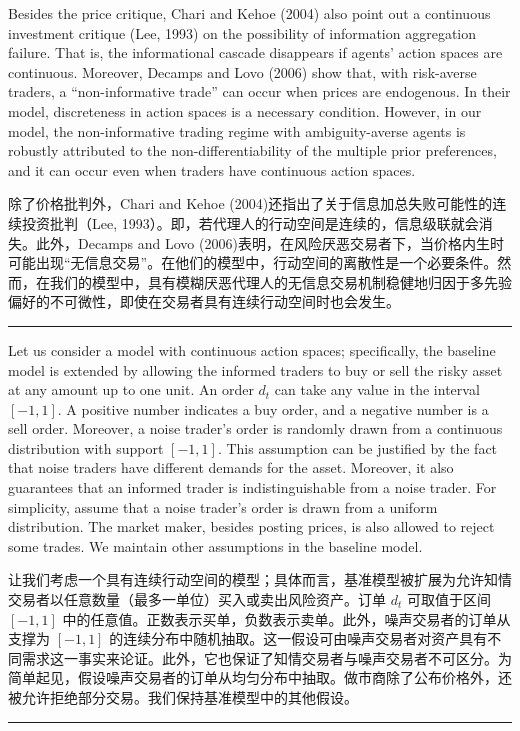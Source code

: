 \documentclass[12pt,a4paper]{article}
\newenvironment{original}{%
  \par\vspace{4pt}\noindent%
  \color{black}%
  \ignorespaces
}{%
  \par\vspace{2pt}%
}
\newenvironment{translation}{%
  \par\vspace{2pt}\noindent%
  \color{transblue}%
  \ignorespaces
}{%
  \par\vspace{4pt}\hrule\vspace{6pt}%
}
\begin{document}
\begin{original}
Besides the price critique, Chari and Kehoe (2004) also point out a continuous investment critique (Lee, 1993) on the possibility of information aggregation failure. That is, the informational cascade disappears if agents' action spaces are continuous. Moreover, Decamps and Lovo (2006) show that, with risk-averse traders, a ``non-informative trade'' can occur when prices are endogenous. In their model, discreteness in action spaces is a necessary condition. However, in our model, the non-informative trading regime with ambiguity-averse agents is robustly attributed to the non-differentiability of the multiple prior preferences, and it can occur even when traders have continuous action spaces.
\end{original}
\begin{translation}
除了价格批判外，Chari and Kehoe (2004)还指出了关于信息加总失败可能性的连续投资批判（Lee, 1993）。即，若代理人的行动空间是连续的，信息级联就会消失。此外，Decamps and Lovo (2006)表明，在风险厌恶交易者下，当价格内生时可能出现``无信息交易''。在他们的模型中，行动空间的离散性是一个必要条件。然而，在我们的模型中，具有模糊厌恶代理人的无信息交易机制稳健地归因于多先验偏好的不可微性，即使在交易者具有连续行动空间时也会发生。
\end{translation}

\begin{original}
Let us consider a model with continuous action spaces; specifically, the baseline model is extended by allowing the informed traders to buy or sell the risky asset at any amount up to one unit. An order $d_t$ can take any value in the interval $[-1, 1]$. A positive number indicates a buy order, and a negative number is a sell order. Moreover, a noise trader's order is randomly drawn from a continuous distribution with support $[-1, 1]$. This assumption can be justified by the fact that noise traders have different demands for the asset. Moreover, it also guarantees that an informed trader is indistinguishable from a noise trader. For simplicity, assume that a noise trader's order is drawn from a uniform distribution. The market maker, besides posting prices, is also allowed to reject some trades. We maintain other assumptions in the baseline model.
\end{original}
\begin{translation}
让我们考虑一个具有连续行动空间的模型；具体而言，基准模型被扩展为允许知情交易者以任意数量（最多一单位）买入或卖出风险资产。订单 $d_t$ 可取值于区间 $[-1, 1]$ 中的任意值。正数表示买单，负数表示卖单。此外，噪声交易者的订单从支撑为 $[-1, 1]$ 的连续分布中随机抽取。这一假设可由噪声交易者对资产具有不同需求这一事实来论证。此外，它也保证了知情交易者与噪声交易者不可区分。为简单起见，假设噪声交易者的订单从均匀分布中抽取。做市商除了公布价格外，还被允许拒绝部分交易。我们保持基准模型中的其他假设。
\end{translation}
\end{document}
